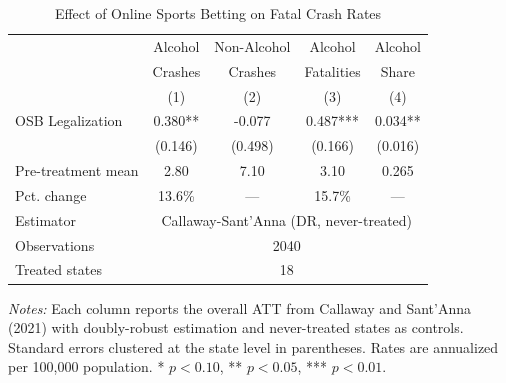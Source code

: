 \begin{table}[t]
\centering
\caption{Effect of Online Sports Betting on Fatal Crash Rates}
\label{tab:main}
\begin{tabular}{lcccc}
\toprule
 & Alcohol & Non-Alcohol & Alcohol & Alcohol \\
 & Crashes & Crashes & Fatalities & Share \\
 & (1) & (2) & (3) & (4) \\
\midrule
OSB Legalization & 0.380** & -0.077 & 0.487*** & 0.034** \\
 & (0.146) & (0.498) & (0.166) & (0.016) \\
\midrule
Pre-treatment mean & 2.80 & 7.10 & 3.10 & 0.265 \\
Pct. change & 13.6\% & --- & 15.7\% & --- \\
Estimator & \multicolumn{4}{c}{Callaway-Sant'Anna (DR, never-treated)} \\
Observations & \multicolumn{4}{c}{2040} \\
Treated states & \multicolumn{4}{c}{18} \\
\bottomrule
\end{tabular}
\begin{tablenotes}
\small
\item \textit{Notes:} Each column reports the overall ATT from Callaway and Sant'Anna (2021) with doubly-robust estimation and never-treated states as controls. Standard errors clustered at the state level in parentheses. Rates are annualized per 100,000 population. * $p<0.10$, ** $p<0.05$, *** $p<0.01$.
\end{tablenotes}
\end{table}
